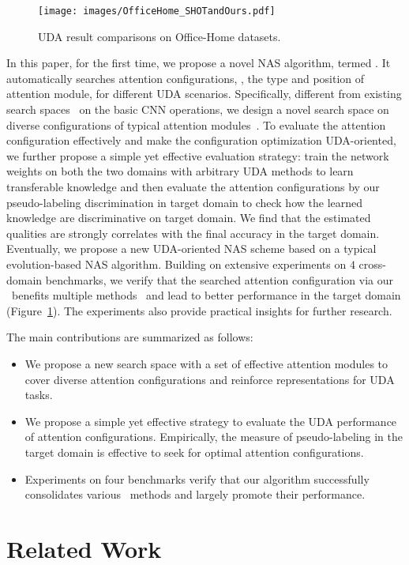 \documentclass[10pt,twocolumn,letterpaper]{article}
\begin{document}
\begin{figure}
    \centering
    \texttt{[image: images/OfficeHome\_SHOTandOurs.pdf]}
    \caption{UDA result comparisons on Office-Home datasets.
}
    \label{fig:SHOT_vs_SHOTandOurs}
    \vspace{-4mm}
\end{figure} 
In this paper, for the first time, we propose a novel NAS algorithm, termed \iMethod.
It automatically searches attention configurations, \ie, the type and position of attention module, for different UDA scenarios.
Specifically, different from existing search spaces~\cite{zoph2018NASNet,liu2018DARTS} on the basic CNN operations, we design a novel search space on diverse configurations of typical attention modules~\cite{woo2018cbam,hu2018SENet,gao2019GSoP}. 
To evaluate the attention configuration effectively and make the configuration optimization UDA-oriented, we further propose a simple yet effective evaluation strategy: train the network weights on both the two domains with arbitrary UDA methods to learn transferable knowledge and then evaluate the attention configurations by our pseudo-labeling discrimination in target domain to check how the learned knowledge are discriminative on target domain. We find that the estimated qualities are strongly correlates with the final accuracy in the target domain.
Eventually, we propose a new UDA-oriented NAS scheme based on a typical evolution-based NAS algorithm.
Building on extensive experiments on $4$ cross-domain benchmarks, we verify that the searched attention configuration via our \iMethod\ benefits multiple \SOTA methods~\cite{liang2020shot,ge2020MMT,wang2020PAN} and lead to better performance in the target domain (Figure~\ref{fig:SHOT_vs_SHOTandOurs}). The experiments also provide practical insights for further research.

The main contributions are summarized as follows:
\begin{itemize}[leftmargin=*]
    \setlength{\itemsep}{0pt}
    \setlength{\parsep}{0pt}
    \item We propose a new search space with a set of effective attention modules to cover diverse attention configurations and reinforce representations for UDA tasks.
    
    \item We propose a simple yet effective strategy to evaluate the UDA performance of attention configurations. Empirically, the measure of pseudo-labeling in the target domain is effective to seek for optimal attention configurations.
    
    \item Experiments on four benchmarks verify that our algorithm successfully consolidates various \SOTA\ methods and largely promote their performance.
\end{itemize} \section{Related Work}
\end{document}
